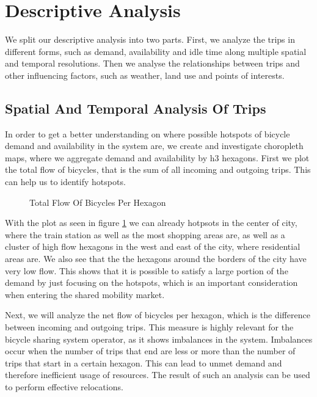 \section{Descriptive Analysis}
\label{sec:descriptive_analysis}

We split our descriptive analysis into two parts.
First, we analyze the trips in different forms, such as demand, availability and
idle time along multiple spatial and temporal resolutions. Then we analyse the
relationships between trips and other influencing factors, such as weather,
land use and points of interests.


\subsection{Spatial And Temporal Analysis Of Trips}
\label{subsec:descriptive_analysis_spatial_temporal}

In order to get a better understanding on where possible hotspots of bicycle
demand and availability in the system are, we create and investigate choropleth maps,
where we aggregate demand and availability by h3 hexagons.
First we plot the total flow of bicycles, that is the sum of all incoming and
outgoing trips. This can help us to identify hotspots.

\begin{figure}[htb]
    \centering
    \caption{Total Flow Of Bicycles Per Hexagon}
    \label{fig:descriptive_analysis_total_flow}
\end{figure}

With the plot as seen in figure \ref{fig:descriptive_analysis_total_flow} we
can already hotpsots in the center of city, where the train station as well as
the most shopping areas are, as well as a cluster of high flow hexagons in the
west and east of the city, where residential areas are.
We also see that the the hexagons around the borders of the city have very low flow. This shows that it is possible to satisfy a large portion of the demand by just focusing on the hotspots, which is an important consideration when entering the shared mobility market.

Next, we will analyze the net flow of bicycles per hexagon, which is the
difference between incoming and outgoing trips. This measure is highly relevant
for the bicycle sharing system operator, as it shows imbalances in the system.
Imbalances occur when the number of trips that end are less or more than the
number of trips that start in a certain hexagon. This can lead to unmet demand
and therefore inefficient usage of resources. The result of such an analysis
can be used to perform effective relocations.

